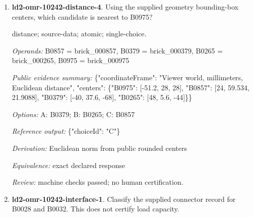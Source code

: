 \begin{enumerate}
\par{\small shape-match; visual; atomic; single-choice.\par\textit{Operands:} B0485 = brick\_000485, B0180 = brick\_000180, B0975 = brick\_000975, B1004 = brick\_001004, B0657 = brick\_000657\par\textit{Public evidence summary:} Numbered PNG: benchmark/ldraw-v2/inputs/views/ld2-omr-10242-shape-match-4.png; structured input = \{\}.\par\textit{Options:} A: B0657; B: B0485; C: B1004; D: B0180\par\textit{Reference output:} \{"choiceId": "B"\}\par\textit{Derivation:} source partNumber equality across labeled candidates; source oracle only\par\textit{Equivalence:} same source partNumber; ignore color and pose; perceptual equivalence pending\par\textit{Review:} pending required human review.}
\item \textbf{ld2-omr-10242-distance-4}. Using the supplied geometry bounding-box centers, which candidate is nearest to B0975?
\par{\small distance; source-data; atomic; single-choice.\par\textit{Operands:} B0857 = brick\_000857, B0379 = brick\_000379, B0265 = brick\_000265, B0975 = brick\_000975\par\textit{Public evidence summary:} \{"coordinateFrame": "Viewer world, millimeters, Euclidean distance", "centers": \{"B0975": [-51.2, 28, 28], "B0857": [24, 59.534, 21.9088], "B0379": [-40, 37.6, -68], "B0265": [48, 5.6, -44]\}\}\par\textit{Options:} A: B0379; B: B0265; C: B0857\par\textit{Reference output:} \{"choiceId": "C"\}\par\textit{Derivation:} Euclidean norm from public rounded centers\par\textit{Equivalence:} exact declared response\par\textit{Review:} machine checks passed; no human certification.}
\item \textbf{ld2-omr-10242-interface-1}. Classify the supplied connector record for B0028 and B0032. This does not certify load capacity.

\end{enumerate}
